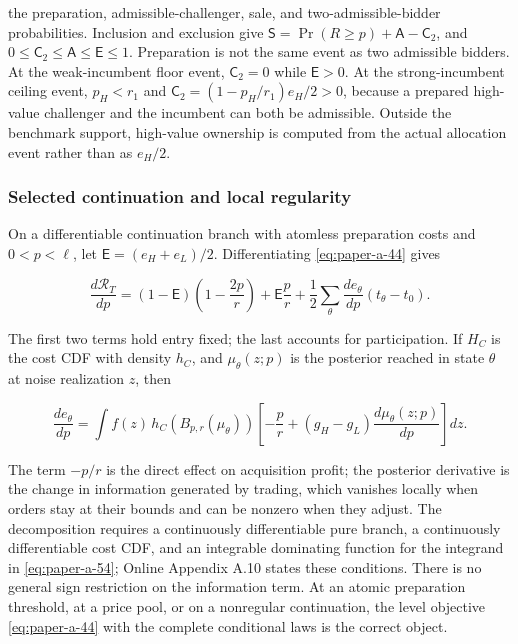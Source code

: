 \documentclass[
  12pt,
]{article}
\begin{document}
the preparation, admissible-challenger, sale, and two-admissible-bidder
probabilities. Inclusion and exclusion give
\(\mathsf S=\Pr(R\ge p)+\mathsf A-\mathsf C_2\), and
\(0\le\mathsf C_2\le\mathsf A\le\mathsf E\le1\). Preparation is not the
same event as two admissible bidders. At the weak-incumbent floor event,
\(\mathsf C_2=0\) while \(\mathsf E>0\). At the strong-incumbent ceiling
event, \(p_H<r_1\) and \(\mathsf C_2=(1-p_H/r_1)e_H/2>0\), because a
prepared high-value challenger and the incumbent can both be admissible.
Outside the benchmark support, high-value ownership is computed from the
actual allocation event rather than as \(e_H/2\).

\subsubsection{Selected continuation and local
regularity}\label{selected-continuation-and-local-regularity}

On a differentiable continuation branch with atomless preparation costs
and \(0<p<\ell\), let \(\mathsf E=(e_H+e_L)/2\). Differentiating
\eqref{eq:paper-a-44} gives

\[
\frac{d\mathcal R_T}{dp}
=(1-\mathsf E)\left(1-\frac{2p}{r}\right)+\mathsf E\frac p r
+\frac12\sum_\theta\frac{de_\theta}{dp}(t_\theta-t_0).
\tag{A.53}\label{eq:paper-a-53}
\]

The first two terms hold entry fixed; the last accounts for
participation. If \(H_C\) is the cost CDF with density \(h_C\), and
\(\mu_\theta(z;p)\) is the posterior reached in state \(\theta\) at
noise realization \(z\), then

\[
\frac{de_\theta}{dp}
=\int f(z)\,h_C(B_{p,r}(\mu_\theta))
\left[-\frac p r+(g_H-g_L)\frac{d\mu_\theta(z;p)}{dp}\right]dz.
\tag{A.54}\label{eq:paper-a-54}
\]

The term \(-p/r\) is the direct effect on acquisition profit; the
posterior derivative is the change in information generated by trading,
which vanishes locally when orders stay at their bounds and can be
nonzero when they adjust. The decomposition requires a continuously
differentiable pure branch, a continuously differentiable cost CDF, and
an integrable dominating function for the integrand in
\eqref{eq:paper-a-54}; Online Appendix A.10 states these conditions.
There is no general sign restriction on the information term. At an
atomic preparation threshold, at a price pool, or on a nonregular
continuation, the level objective \eqref{eq:paper-a-44} with the
complete conditional laws is the correct object.
\end{document}
